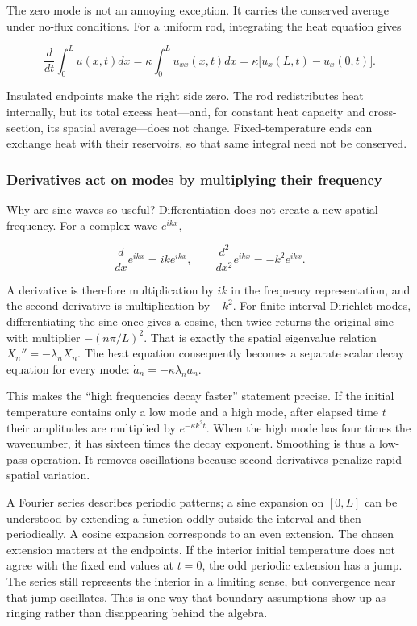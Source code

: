 The zero mode is not an annoying exception. It carries the conserved average under no-flux conditions. For a uniform rod, integrating the heat equation gives

\[
\frac{d}{dt}\int_0^L u(x,t)dx
=\kappa\int_0^L u_{xx}(x,t)dx
=\kappa\big[u_x(L,t)-u_x(0,t)\big].
\]

Insulated endpoints make the right side zero. The rod redistributes heat internally, but its total excess heat---and, for constant heat capacity and cross-section, its spatial average---does not change. Fixed-temperature ends can exchange heat with their reservoirs, so that same integral need not be conserved.

\subsubsection{Derivatives act on modes by multiplying their frequency}\label{02-foundations-ii-ch025-derivatives-act-on-modes-by-multiplying-their-frequency}

Why are sine waves so useful? Differentiation does not create a new spatial frequency. For a complex wave \(e^{ikx}\),

\[
\frac{d}{dx}e^{ikx}=ik e^{ikx},
\qquad
\frac{d^2}{dx^2}e^{ikx}=-k^2 e^{ikx}.
\]

A derivative is therefore multiplication by \(ik\) in the frequency representation, and the second derivative is multiplication by \(-k^2\). For finite-interval Dirichlet modes, differentiating the sine once gives a cosine, then twice returns the original sine with multiplier \(-(n\pi/L)^2\). That is exactly the spatial eigenvalue relation \(X_n''=-\lambda_nX_n\). The heat equation consequently becomes a separate scalar decay equation for every mode: \(\dot a_n=-\kappa\lambda_na_n\).

This makes the ``high frequencies decay faster'' statement precise. If the initial temperature contains only a low mode and a high mode, after elapsed time \(t\) their amplitudes are multiplied by \(e^{-\kappa k^2t}\). When the high mode has four times the wavenumber, it has sixteen times the decay exponent. Smoothing is thus a low-pass operation. It removes oscillations because second derivatives penalize rapid spatial variation.

A Fourier series describes periodic patterns; a sine expansion on \([0,L]\) can be understood by extending a function oddly outside the interval and then periodically. A cosine expansion corresponds to an even extension. The chosen extension matters at the endpoints. If the interior initial temperature does not agree with the fixed end values at \(t=0\), the odd periodic extension has a jump. The series still represents the interior in a limiting sense, but convergence near that jump oscillates. This is one way that boundary assumptions show up as ringing rather than disappearing behind the algebra.

